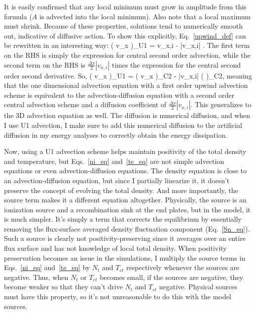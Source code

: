 It is easily confirmed that any local minimum must grow in amplitude from this formula ($A$ is advected into the local minimum). Also note that a local maximum must shrink. Because of these
properties, solutions tend to numerically smooth out, indicative of diffusive action. To show this explicitly, Eq.~\ref{upwind_def} can be rewritten in an interesting way:
\beq
\label{u1_exp}
\left( v_x  \right)_{U1} = v_{x,i}  -  |v_{x,i}| .
\eeq
The first term on the RHS is simply the expression for central second order advection, while the second term on the RHS is $\frac{\Delta x}{2} |v_{x,i}|$ times the expression for the central
second order second derivative. So,
\beq
\label{u1_symb}
\left( v_x  \right)_{U1} = \left( v_x  \right)_{C2} -  |v_{x,i}| \left(  \right)_{C2},
\eeq
meaning that the one dimensional advection equation with a first order upwind advection scheme is equivalent to the advection-diffusion equation with a second order central advection scheme 
and a diffusion coefficient of $\frac{\Delta x}{2} |v_{x,i}|$. This generalizes to the 3D advection equation as well. The diffusion is numerical diffusion, and when I use U1 advection, I make
sure to add this numerical diffusion to the artificial diffusion in my energy analyses to correctly obtain the energy dissipation.

Now, using a U1 advection scheme helps maintain positivity of the total density and temperature, but Eqs.~\ref{ni_eq} and~\ref{te_eq} are not simple advection equations or even advection-diffusion
equations. The density equation is close to an advection-diffusion equation, but since I partially linearize it, it doesn't preserve the concept of evolving the total density. And more
importantly, the source term makes it a different equation altogether. Physically, the source is an ionization source and a recombination sink at the end plates, but in the model, it is much
simpler. It's simply a term that corrects the equilibrium by essentially removing the flux-surface averaged density fluctuation component (Eq.~\ref{Sn_eq}). 
Such a source is clearly not positivity-preserving since it averages over an entire flux surface and has not knowledge of local total density. When positivity preservation becomes an issue
in the simulations, I multiply the source terms in Eqs.~\ref{ni_eq} and~\ref{te_eq} by $N_{t}$ and $T_{et}$ respectively whenever the sources are negative. Thus, when $N_{t}$ or $T_{et}$
becomes small, if the sources are negative, they become weaker so that they can't drive $N_{t}$ and $T_{et}$ negative. Physical sources must have this property, so it's not unreasonable
to do this with the model sources.

